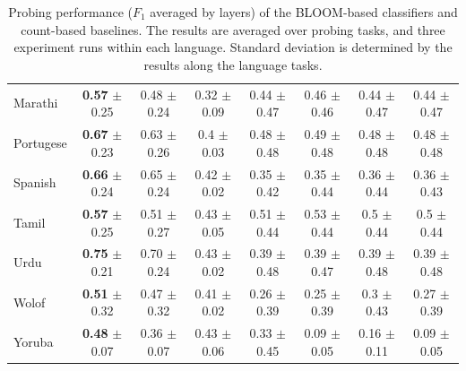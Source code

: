 \begin{table}[t!]
{\begin{tabular}{lccccccc}
Marathi    &  \textbf{0.57} \tiny{$\pm$0.25} &  0.48 \tiny{$\pm$0.24} &  0.32 \tiny{$\pm$0.09}  & 0.44 \tiny{$\pm$0.47} &  0.46 \tiny{$\pm$0.46} &  0.44 \tiny{$\pm$0.47} &  0.44 \tiny{$\pm$0.47} \\
Portugese  &  \textbf{0.67} \tiny{$\pm$0.23} &  0.63 \tiny{$\pm$0.26} & 0.4 \tiny{$\pm$0.03}  &  0.48 \tiny{$\pm$0.48} &  0.49 \tiny{$\pm$0.48} &  0.48 \tiny{$\pm$0.48} &  0.48 \tiny{$\pm$0.48} \\
Spanish    &  \textbf{0.66} \tiny{$\pm$0.24} &  0.65 \tiny{$\pm$0.24} & 0.42 \tiny{$\pm$0.02} & 0.35 \tiny{$\pm$0.42} &  0.35 \tiny{$\pm$0.44} &  0.36 \tiny{$\pm$0.44} &  0.36 \tiny{$\pm$0.43} \\
Tamil      &  \textbf{0.57} \tiny{$\pm$0.25} &  0.51 \tiny{$\pm$0.27} & 0.43 \tiny{$\pm$0.05} & 0.51 \tiny{$\pm$0.44} &  0.53 \tiny{$\pm$0.44} &   0.5 \tiny{$\pm$0.44} &   0.5 \tiny{$\pm$0.44} \\
Urdu       &  \textbf{0.75} \tiny{$\pm$0.21} &   0.70 \tiny{$\pm$0.24} & 0.43 \tiny{$\pm$0.02} & 0.39 \tiny{$\pm$0.48} &  0.39 \tiny{$\pm$0.47} &  0.39 \tiny{$\pm$0.48} &  0.39 \tiny{$\pm$0.48} \\
Wolof      & \textbf{0.51} \tiny{$\pm$0.32} &  0.47 \tiny{$\pm$0.32} & 0.41 \tiny{$\pm$0.02} & 0.26 \tiny{$\pm$0.39} &  0.25 \tiny{$\pm$0.39} &   0.3 \tiny{$\pm$0.43} &  0.27 \tiny{$\pm$0.39} \\
Yoruba     &  \textbf{0.48} \tiny{$\pm$0.07} &  0.36 \tiny{$\pm$0.07} & 0.43 \tiny{$\pm$0.06} & 0.33 \tiny{$\pm$0.45} &  0.09 \tiny{$\pm$0.05} &  0.16 \tiny{$\pm$0.11} &  0.09 \tiny{$\pm$0.05} \\
\bottomrule
\end{tabular}}
\caption{Probing performance ($F_1$ averaged by layers) of the BLOOM-based classifiers and count-based baselines. The results are averaged over probing tasks, and three experiment runs within each language. Standard deviation is determined by the results along the language tasks.}
\label{tab:bloom:probing}
\end{table}